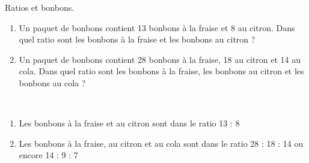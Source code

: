 \begin{exercice*}
   Ratios et bonbons.
   \begin{enumerate}
      \item Un paquet de bonbons contient 13 bonbons à la fraise et 8 au citron. Dans quel ratio sont les bonbons à la fraise et les bonbons au citron ?
      \item Un paquet de bonbons contient 28 bonbons à la fraise, 18 au citron et 14 au cola. Dans quel ratio sont les bonbons à la fraise, les bonbons au citron et les bonbons au cola ?
   \end{enumerate}
\end{exercice*}
\begin{corrige}
   \ \\ [-5mm]
   \begin{enumerate}
      \item Les bonbons à la fraise et au citron sont dans le ratio {\color{red} 13 : 8}
      \item Les bonbons à la fraise, au citron et au cola sont dans le ratio {\color{red} 28 : 18 : 14} ou encore 14 : 9 : 7
   \end{enumerate}
\end{corrige}
